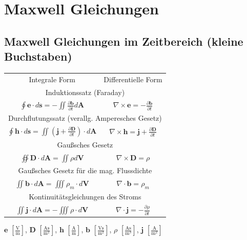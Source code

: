 \documentclass[english]{latex4ei/latex4ei_sheet}
\begin{document}
\section{Maxwell Gleichungen}
\begin{sectionbox}
	\subsection{Maxwell Gleichungen im Zeitbereich (kleine Buchstaben)}
	\begin{tabular*}{\columnwidth}{c | c}
		Integrale Form & Differentielle Form \\

		\multicolumn{2}{c}{Induktionssatz (Faraday)} \\
		\hline
		$\oint \mathbf{e} \cdot d\mathbf{s} = -\iint \frac{\partial\mathbf{b}}{\partial t} d\mathbf{A}$ &  $\nabla \times \mathbf{e} = - \frac{\partial \mathbf{b}}{\partial t}$\\
		\hline
		\multicolumn{2}{c}{Durchflutungssatz (verallg. Amperesches Gesetz)} \\
		\hline
		$\oint \mathbf{h} \cdot d\mathbf{s} = \iint (\mathbf{j} + \frac{\partial \mathbf{D}}{\partial t}) \cdot d\mathbf{A}$ & $\nabla \times \mathbf{h} = \mathbf{j} + \frac{\partial \mathbf{D}}{\partial t}$ \\
		\hline
		\multicolumn{2}{c}{Gaußsches Gesetz} \\
		\hline
		$\oiint \mathbf{D} \cdot d\mathbf{A} = \iint \rho d\mathbf{V}$ & $\nabla \times \mathbf{D} = \rho$\\
		\hline
		\multicolumn{2}{c}{Gaußsches Gesetz für die mag. Flussdichte} \\
		\hline
		$\iint \mathbf{b} \cdot d\mathbf{A} = \iiint \rho_m \cdot d\mathbf{V}$ & $\nabla \cdot \mathbf{b} = \rho_m$ \\
		\hline
		\multicolumn{2}{c}{Kontinuitätsgleichungen des Stroms} \\
		\hline
		$\iint \mathbf{j} \cdot d\mathbf{A} = -\iiint \rho \cdot d\mathbf{V}$ & $\nabla \cdot \mathbf{j} = - \frac{\partial \rho}{\partial t}$\\
	\end{tabular*}
	
 $\mathbf{e}$ $\left[ \frac{\text{V}}{\text{m}} \right]$,  $\mathbf{D}$ $\left[ \frac{\text{As}}{\text{m}^2} \right]$, $\mathbf{h}$ $\left[ \frac{\text{A}}{\text{m}} \right]$, $\mathbf{b}$ $\left[ \frac{\text{Vs}}{\text{m}^2} \right]$, $\rho$ $\left[ \frac{\text{As}}{\text{m}^3} \right]$, $\mathbf{j}$ $\left[ \frac{\text{A}}{\text{m}^2} \right]$
\end{sectionbox}
\end{document}
